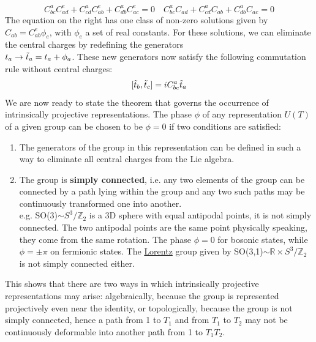 \documentclass[../main.tex]{subfiles}
\begin{document}
\[
C^a_{bc}C^e_{ad}+C^a_{cd}C^e_{ab}+C^a_{db}C^e_{ac}=0 \quad C^a_{bc}C_{ad}+C^a_{cd}C_{ab}+C^a_{db}C_{ac}=0
\]
The equation on the right has one class of non-zero solutions given by $C_{ab}=C^e_{ab}\phi_e$, with $\phi_e$ a set of real constants. For these solutions, we can eliminate the central charges by redefining the generators\\
$t_a\to\Tilde{t}_a=t_a+\phi_a$. These new generators now satisfy the following commutation rule without central charges:
\[
[\Tilde{t}_b,\Tilde{t}_c]=iC^a_{bc}\Tilde{t}_a
\]
We are now ready to state the theorem that governs the occurrence of intrinsically projective representations. The phase $\phi$ of any representation $U(T)$ of a given group can be chosen to be $\phi=0$ if two conditions are satisfied:
\begin{enumerate}
    \item The generators of the group in this representation can be defined in such a way to eliminate all central charges from the Lie algebra.
    \item The group is \textbf{simply connected}, i.e. any two elements of the group can be connected by a path lying within the group and any two such paths may be continuously transformed one into another.\\
    e.g. SO(3)$\sim S^3/\mathbb{Z}_2$ is a 3D sphere with equal antipodal points, it is not simply connected. The two antipodal points are the same point physically speaking, they come from the same rotation. The phase $\phi=0$ for bosonic states, while $\phi=\pm\pi$ on fermionic states. The \href{https://en.wikipedia.org/wiki/Hendrik_Lorentz}{Lorentz} group given by SO(3,1)$\sim\mathbb{R}\times S^3/\mathbb{Z}_2$ is not simply connected either.
\end{enumerate}
This shows that there are two ways in which intrinsically projective representations may arise: algebraically, because the group is represented projectively even near the identity, or topologically, because the group is not simply connected, hence a path from 1 to $T_1$ and from $T_1$ to $T_2$ may not be continuously deformable into another path from 1 to $T_1T_2$.
\end{document}
